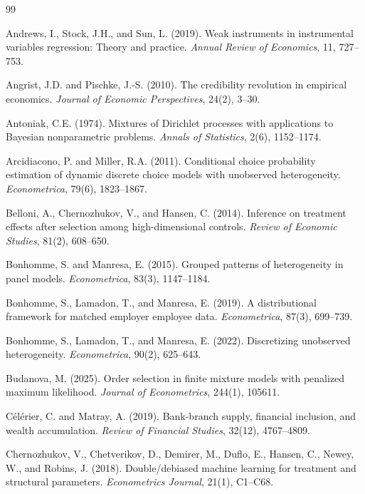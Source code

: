 \documentclass[12pt]{article}
\begin{document}
\begin{thebibliography}{99}

Andrews, I., Stock, J.H., and Sun, L. (2019). Weak instruments in instrumental variables regression: Theory and practice. \textit{Annual Review of Economics}, 11, 727--753.

Angrist, J.D. and Pischke, J.-S. (2010). The credibility revolution in empirical economics. \textit{Journal of Economic Perspectives}, 24(2), 3--30.

Antoniak, C.E. (1974). Mixtures of Dirichlet processes with applications to Bayesian nonparametric problems. \textit{Annals of Statistics}, 2(6), 1152--1174.

Arcidiacono, P. and Miller, R.A. (2011). Conditional choice probability estimation of dynamic discrete choice models with unobserved heterogeneity. \textit{Econometrica}, 79(6), 1823--1867.

Belloni, A., Chernozhukov, V., and Hansen, C. (2014). Inference on treatment effects after selection among high-dimensional controls. \textit{Review of Economic Studies}, 81(2), 608--650.

Bonhomme, S. and Manresa, E. (2015). Grouped patterns of heterogeneity in panel models. \textit{Econometrica}, 83(3), 1147--1184.

Bonhomme, S., Lamadon, T., and Manresa, E. (2019). A distributional framework for matched employer employee data. \textit{Econometrica}, 87(3), 699--739.

Bonhomme, S., Lamadon, T., and Manresa, E. (2022). Discretizing unobserved heterogeneity. \textit{Econometrica}, 90(2), 625--643.

Budanova, M. (2025). Order selection in finite mixture models with penalized maximum likelihood. \textit{Journal of Econometrics}, 244(1), 105611.

C\'{e}l\'{e}rier, C. and Matray, A. (2019). Bank-branch supply, financial inclusion, and wealth accumulation. \textit{Review of Financial Studies}, 32(12), 4767--4809.

Chernozhukov, V., Chetverikov, D., Demirer, M., Duflo, E., Hansen, C., Newey, W., and Robins, J. (2018). Double/debiased machine learning for treatment and structural parameters. \textit{Econometrics Journal}, 21(1), C1--C68.


\end{thebibliography}
\end{document}
